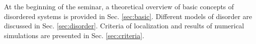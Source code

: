 \documentclass[10pt,a4paper]{article}
\begin{document}
\noindent At the beginning of the seminar, a theoretical overview of basic concepts of disordered systems is provided in Sec. \ref{sec:basic}. Different models of disorder are discussed in Sec. \ref{sec:disorder}. Criteria of localization and results of numerical simulations are presented in Sec. \ref{sec:criteria}. 


\end{document}
